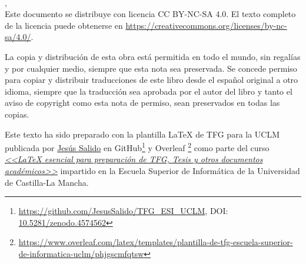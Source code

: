 %
%


\ifspanish
\else
\fi
\null\vspace{6cm}
\makeatletter
{\small \noindent \@tituloCorto\\
\textcopyright{} \@autor, \@yearDefensa\\[1cm]
Este documento se distribuye con licencia CC BY-NC-SA 4.0. El texto completo de la licencia puede obtenerse en \url{https://creativecommons.org/licenses/by-nc-sa/4.0/}.
\makeatother

La copia y distribución de esta obra está permitida en todo el mundo, sin regalías y por cualquier medio, siempre que esta nota sea preservada. Se concede permiso para copiar y distribuir traducciones de este libro desde el español original a otro idioma, siempre que la traducción sea aprobada por el autor del libro y tanto el aviso de copyright como esta nota de permiso, sean preservados en todas las copias.

Este texto ha sido preparado con la plantilla \LaTeX{} de TFG para la UCLM publicada por \href{https://www.esi.uclm.es/www/jsalido}{Jesús Salido} en GitHub\footnote{\url{https://github.com/JesusSalido/TFG_ESI_UCLM}, DOI: \href{https://zenodo.org/badge/latestdoi/191907589}{10.5281/zenodo.4574562}} y Overleaf \footnote{\url{https://www.overleaf.com/latex/templates/plantilla-de-tfg-escuela-superior-de-informatica-uclm/phjgscmfqtsw}} como parte del curso \href{http://visilab.etsii.uclm.es/?page_id=1468}{\emph{<<\LaTeX{} esencial para preparación de TFG, Tesis y otros documentos académicos>>}} impartido en la Escuela Superior de Informática de la Universidad de Castilla-La Mancha.}

